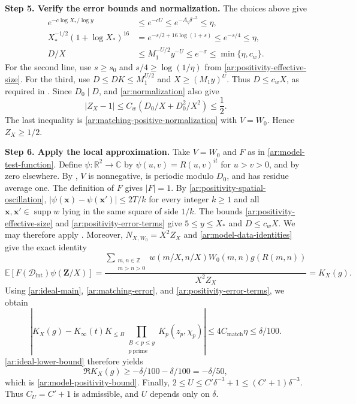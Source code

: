 \documentclass[twoside]{aomart}
\makeatletter
\theoremstyle{paperplain}
\theoremstyle{paperdefinition}
\renewenvironment{proof}[1][\proofname]{\par\pushQED{\qed}%
  \normalfont\topsep6\p@\@plus3\p@\relax\trivlist
  \item[\hskip\labelsep\itshape #1\@addpunct{.}]\ignorespaces
}{\popQED\endtrivlist\@endpefalse}
\newcommand{\E}{\mathbb E}
\newcommand{\Z}{\mathbb Z}
\newcommand{\R}{\mathbb R}
\newcommand{\C}{\mathbb C}
\numberwithin{equation}{section}
\makeatother
\begin{document}
\begin{proof}
\par
\medskip
\noindent\textbf{Step 5. Verify the error bounds and normalization.}
The choices above give
\begin{equation}
 \begin{aligned}
 e^{-c\log X_*/\log y}
 &\le e^{-cU}\le e^{-A_\eta\delta^{-3}}\le\eta,\\
 X_*^{-1/2}(1+\log X_*)^{16}
 &=e^{-s/2+16\log(1+s)}\le e^{-s/4}\le\eta,\\
 D/X&\le M_1^{-U/2}y^{-U}\le e^{-\sigma}
       \le\min\{\eta,c_w\}.
 \end{aligned}
 \label{ar:positivity-error-terms}
\end{equation}
For the second line, use $s\ge s_0$ and
$s/4\ge\log(1/\eta)$ from \eqref{ar:positivity-effective-size}.
For the third, use $D\le DK\le M_1^{U/2}$ and
$X\ge(M_1y)^U$.
Thus $D\le c_wX$, as required in .
Since $D_0\mid D$,  and
\eqref{ar:normalization} also give
\begin{equation*}
 |Z_X-1|\le C_w(D_0/X+D_0^2/X^2)\le\frac12.
 \end{equation*}
The last inequality is \eqref{ar:matching-positive-normalization}
with $V=W_0$. Hence $Z_X\ge1/2$.

\par
\medskip
\noindent\textbf{Step 6. Apply the local approximation.}
Take $V=W_0$ and $F$ as in \eqref{ar:model-test-function}.
Define $\psi:\R^2\to\C$ by $\psi(u,v)=R(u,v)^{it}$ for $u>v>0$,
and by zero elsewhere.
By , $V$ is nonnegative, is periodic modulo $D_0$,
and has residue average one. The definition of $F$ gives $|F|=1$.
By \eqref{ar:positivity-spatial-oscillation},
$|\psi(\mathbf x)-\psi(\mathbf x')|\le2T/k$ for every integer $k\ge1$
and all $\mathbf x,\mathbf x'\in\operatorname{supp}w$ lying in the
same square of side $1/k$.
The bounds \eqref{ar:positivity-effective-size} and
\eqref{ar:positivity-error-terms} give $5\le y\le X_*$ and $D\le c_wX$.
We may therefore apply .
Moreover, $N_{X,W_0}=X^2Z_X$ and
\eqref{ar:model-data-identities} give the exact identity
\begin{equation*}
 \E[F(\mathcal D_{\mathrm{int}})\psi(\mathbf Z/X)]
 =\frac{\displaystyle\sum_{\substack{m,n\in\Z\\m>n>0}}
       w(m/X,n/X)W_0(m,n)g(R(m,n))}{X^2Z_X}
 =K_X(g).
 \end{equation*}
Using \eqref{ar:ideal-main}, \eqref{ar:matching-error}, and
\eqref{ar:positivity-error-terms}, we obtain
\begin{equation*}
 \left|K_X(g)-K_\infty(t)K_{\le B}
                    \prod_{\substack{B<p\le y\\p\ \mathrm{prime}}}K_p(z_p,\chi_p)\right|
 \le4C_{\mathrm{match}}\eta\le\delta/100.
 \end{equation*}
\eqref{ar:ideal-lower-bound} therefore yields
\begin{equation*}
 \Re K_X(g)\ge-\delta/100-\delta/100=-\delta/50,
 \end{equation*}
which is \eqref{ar:model-positivity-bound}.
Finally,
$2\le U\le C'\delta^{-3}+1\le(C'+1)\delta^{-3}$.
Thus $C_U=C'+1$ is admissible, and $U$ depends only on $\delta$.
\end{proof}
\end{document}
